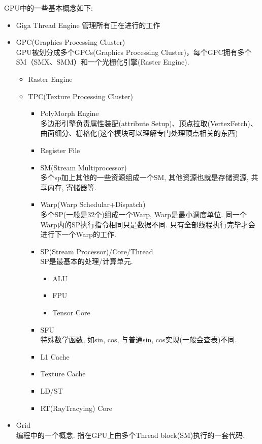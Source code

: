 \documentclass[UTF8]{ctexart}
\begin{document}
GPU中的一些基本概念如下:
\begin{itemize}
\item Giga Thread Engine
  管理所有正在进行的工作
\item GPC(Graphics Processing Cluster)
  \\GPU被划分成多个GPCs(Graphics Processing Cluster)，每个GPC拥有多个SM（SMX、SMM）和一个光栅化引擎(Raster Engine).
  \begin{itemize}
  \item Raster Engine
  \item TPC(Texture Processing Cluster)
    \begin{itemize}
    \item PolyMorph Engine
      \\多边形引擎负责属性装配(attribute Setup)、顶点拉取(VertexFetch)、曲面细分、栅格化(这个模块可以理解专门处理顶点相关的东西)
    \item Register File
    \item SM(Stream Multiprocessor)
      \\多个sp加上其他的一些资源组成一个SM, 其他资源也就是存储资源, 共享内存, 寄储器等.
    \item Warp(Warp Schedular+Dispatch)
      \\多个SP(一般是32个)组成一个Warp, Warp是最小调度单位. 同一个Warp内的SP执行指令相同只是数据不同. 只有全部线程执行完毕才会进行下一个Warp的工作.
    \item SP(Stream Processor)/Core/Thread
      \\SP是最基本的处理/计算单元.
      \begin{itemize}
      \item ALU
      \item FPU
      \item Tensor Core
      \end{itemize}
    \item SFU
      \\特殊数学函数, 如sin, cos, 与普通sin, cos实现(一般会查表)不同.
    \item L1 Cache
    \item Texture Cache
    \item LD/ST
    \item RT(RayTracying) Core
    \end{itemize}
  \end{itemize}
\item Grid
  \\编程中的一个概念. 指在GPU上由多个Thread block(SM)执行的一套代码.
\end{itemize}
\end{document}
